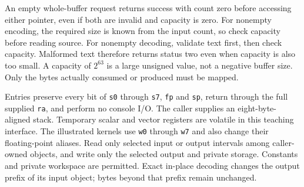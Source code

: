 An empty whole-buffer request returns success with count zero before accessing either
pointer, even if both are invalid and capacity is zero. For nonempty encoding, the
required size is known from the input count, so check capacity before reading source.
For nonempty decoding, validate text first, then check capacity. Malformed text therefore
returns status two even when capacity is also too small. A capacity of \(2^{63}\) is a
large unsigned value, not a negative buffer size. Only the bytes actually consumed or
produced must be mapped.

Entries preserve every bit of \texttt{s0} through \texttt{s7}, \texttt{fp} and
\texttt{sp}, return through the full supplied \texttt{ra}, and perform no console I/O.
The caller supplies an eight-byte-aligned stack. Temporary scalar and vector registers are volatile in this teaching interface. The
illustrated kernels use \texttt{w0} through \texttt{w7} and also change their
floating-point aliases. Read only selected input or output intervals among caller-owned objects,
and write only the selected output and private storage. Constants and private workspace
are permitted. Exact in-place decoding changes the output prefix of its input object;
bytes beyond that prefix remain unchanged.

